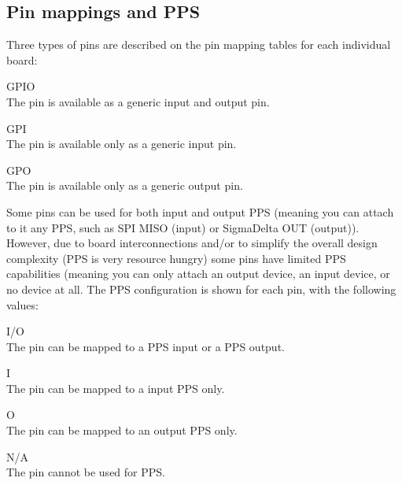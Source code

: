 \documentclass[12pt,a4paper,openany,smallheadings,headinclude,headsepline,final]{scrreprt}
\begin{document}
\subsection{Pin mappings and PPS}
Three types of pins are described on the pin mapping tables for each individual board:
\begin{description}
\item{GPIO} \hfill \\ The pin is available as a generic input and output pin.
\item{GPI} \hfill \\ The pin is available only as a generic input pin.
\item{GPO} \hfill \\ The pin is available only as a generic output pin.
\end{description}
Some pins can be used for both input and output PPS (meaning you can attach to it any PPS, such as SPI MISO (input) or SigmaDelta OUT (output)).
However, due to board interconnections and/or to simplify the overall design complexity (PPS is very resource hungry) some pins
have limited PPS capabilities (meaning you can only attach an output device, an input device, or no
device at all. The PPS configuration is shown for each pin, with the following values:
\begin{description}
\item{I/O} \hfill \\ The pin can be mapped to a PPS input or a PPS output.
\item{I} \hfill \\ The pin can be mapped to a input PPS only.
\item{O} \hfill \\ The pin can be mapped to an output PPS only.
\item{N/A} \hfill \\ The pin cannot be used for PPS.
\end{description}






\end{document}
